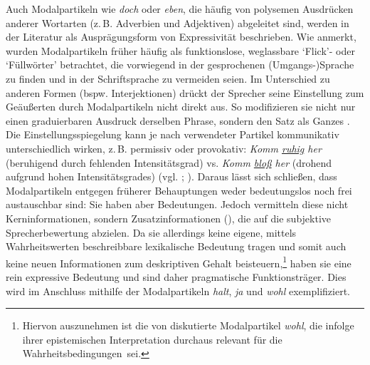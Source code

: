 Auch Modalpartikeln wie \textit{doch} oder \textit{eben}, die häufig von polysemen Ausdrücken anderer Wortarten (z.\,B. Adverbien und Adjektiven) abgeleitet sind, werden in der Literatur als Ausprägungsform von Expressivität beschrieben. Wie {\citet[9]{Weydt.1969}} anmerkt, wurden Modalpartikeln früher häufig als funktionslose, weglassbare \glqq{}`Flick'- oder `Füllwörter'\grqq{} betrachtet, die vorwiegend in der gesprochenen {(Umgangs-)Sprache} zu finden und in der Schriftsprache zu vermeiden seien. Im Unterschied zu anderen Formen (bspw. Interjektionen) drückt der Sprecher seine Einstellung zum Geäußerten durch Modalpartikeln nicht direkt aus. So modifizieren sie nicht nur einen graduierbaren Ausdruck derselben Phrase, sondern den Satz als Ganzes {\citep[vgl.][603]{Duden.2016}}. Die Einstellungsspiegelung kann je nach verwendeter Partikel kommunikativ unterschiedlich wirken, z.\,B. permissiv oder provokativ: \textit{Komm \uline{ruhig} her} (beruhigend durch fehlenden Intensitätsgrad) vs. \textit{Komm \uline{bloß} her} (drohend aufgrund hohen Intensitätsgrades) (vgl. {\citealt[20f.]{Batinic.2015}}; {\citealt[24]{Pittner.2015}}). Daraus lässt sich schließen, dass Modalpartikeln entgegen früherer Behauptungen weder bedeutungslos noch frei austauschbar sind: \glqq{}Sie haben aber Bedeutungen. Jedoch vermitteln diese nicht Kerninformationen, sondern Zusatzinformationen\grqq{} (\citealt[89]{Weydt.1969}), die auf die subjektive Sprecherbewertung abzielen. Da sie allerdings keine eigene, mittels Wahrheitswerten beschreibbare lexikalische Bedeutung tragen und somit auch keine neuen Informationen zum deskriptiven Gehalt beisteuern,\footnote{Hiervon auszunehmen ist die von \citet[]{Zimmermann.2004} diskutierte Modalpartikel \textit{wohl}, die infolge ihrer epistemischen Interpretation durchaus relevant für die \mbox{Wahrheitsbedingungen sei}.} haben sie eine rein expressive Bedeutung und sind daher pragmatische Funktionsträger. Dies wird im Anschluss mithilfe der Modalpartikeln \textit{halt}, \textit{ja} und \textit{wohl} exemplifiziert.

